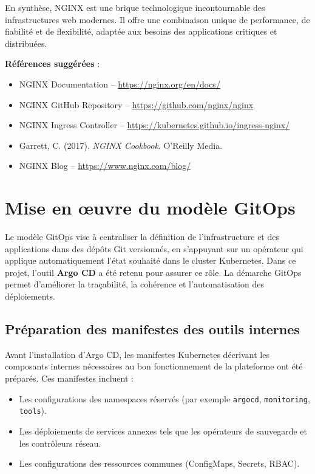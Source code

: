 En synthèse, NGINX est une brique technologique incontournable des infrastructures web modernes. Il offre une combinaison unique de performance, de fiabilité et de flexibilité, adaptée aux besoins des applications critiques et distribuées.

\textbf{Références suggérées} :
\begin{itemize}
	\item NGINX Documentation – \url{https://nginx.org/en/docs/}
	\item NGINX GitHub Repository – \url{https://github.com/nginx/nginx}
	\item NGINX Ingress Controller – \url{https://kubernetes.github.io/ingress-nginx/}
	\item Garrett, C. (2017). \textit{NGINX Cookbook}. O’Reilly Media.
	\item NGINX Blog – \url{https://www.nginx.com/blog/}
\end{itemize}

\section{Mise en œuvre du modèle GitOps}

Le modèle GitOps vise à centraliser la définition de l’infrastructure et des applications dans des dépôts Git versionnés, en s’appuyant sur un opérateur qui applique automatiquement l’état souhaité dans le cluster Kubernetes.
Dans ce projet, l’outil \textbf{Argo CD} a été retenu pour assurer ce rôle.
La démarche GitOps permet d’améliorer la traçabilité, la cohérence et l’automatisation des déploiements.

\subsection{Préparation des manifestes des outils internes}

Avant l’installation d’Argo CD, les manifestes Kubernetes décrivant les composants internes nécessaires au bon fonctionnement de la plateforme ont été préparés.
Ces manifestes incluent :
\begin{itemize}
	\item Les configurations des namespaces réservés (par exemple \texttt{argocd}, \texttt{monitoring}, \texttt{tools}).
	\item Les déploiements de services annexes tels que les opérateurs de sauvegarde et les contrôleurs réseau.
	\item Les configurations des ressources communes (ConfigMaps, Secrets, RBAC).
\end{itemize}

